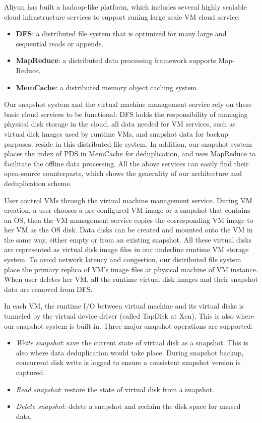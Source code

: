 Aliyun has built a hadoop-like platform, which includes
several highly scalable cloud infrastructure services to support
 runing large scale VM cloud service:
\begin{itemize}
\item \textbf{DFS}: a distributed file system that is optimized for many large and sequential reads or appends.
\item \textbf{MapReduce}: a distributed data processing framework supports Map-Reduce\cite{Dean2004}.
\item \textbf{MemCache}: a distributed memory object caching system.
\end{itemize}
Our snapshot system and the virtual machine management service rely on these basic cloud services
to be functional:
DFS holds the responsibility of managing physical disk storage
in the cloud, all data needed for VM services, such as virtual disk images used by runtime VMs,
and snapshot data for backup purposes, reside in this distributed file system. 
In addition, our snapshot system 
places the index of PDS in MemCache for deduplication, 
and uses MapReduce to facilitate the offline
data processing. All the above services can easily find their open-source counterparts,
which shows the generality of our architecture and deduplication scheme.

User control VMs through the virtual machine management service.
During VM creation, a user chooses a pre-configured VM image or
a snapshot that contains an OS,
then the VM management service 
copies the corresponding VM image to her VM as the OS disk.
Data disks can be created and mounted onto the VM in the same way,
either empty or from an existing snapshot. 
All these virtual disks are represented as virtual disk image files in our
underline runtime VM storage system.  
To avoid network latency and congestion, 
our distributed file system place the primary replica of VM's 
image files at physical machine of VM instance.
When user deletes her VM, all the runtime virtual disk images and
their snapshot data are removed from DFS.

In each VM, 
the runtime I/O between virtual machine and its virtual
disks is tunneled by the virtual device driver (called TapDisk\cite{Warfield2005} at Xen).
This is also where our snapshot system is built in. Three major snapshot operations are supported:
\begin{itemize}
\item \textit{Write snapshot}: save the current state of virtual disk as a snapshot.
This is also where data deduplication would take place.
During snapshot backup, concurrent disk write is logged 
to ensure a consistent snapshot version is captured. 
\item \textit{Read snapshot}: restore the state of virtual disk from a snapshot.
\item \textit{Delete snapshot}: delete a snapshot and reclaim the disk space for unused data.
\end{itemize}

